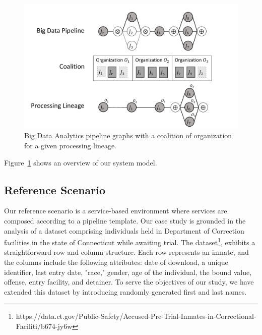 
\begin{figure}[!t]
  \includegraphics[width=0.98\columnwidth]{generaleFig1.pdf}
  \caption{Big Data Analytics pipeline graphs with a coalition of organization for a given processing lineage.}\label{fig:BDpipeline}
\end{figure}

Figure~\ref{fig:BDpipeline} shows an overview of our system model.

\subsection{Reference Scenario}
Our reference scenario is a service-based environment where services are composed according to a pipeline template.
Our case study is grounded in the analysis of a dataset comprising individuals held in Department of Correction facilities in the state of Connecticut while awaiting trial.
The dataset\footnote{https://data.ct.gov/Public-Safety/Accused-Pre-Trial-Inmates-in-Correctional-Faciliti/b674-jy6w}, exhibits a straightforward row-and-column structure.
Each row represents an inmate, and the columns include the following attributes: date of download, a unique identifier, last entry date, "race," gender, age of the individual, the bound value, offense, entry facility, and detainer.
To serve the objectives of our study, we have extended this dataset by introducing randomly generated first and last names.

